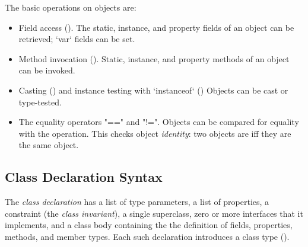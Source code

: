 The basic operations on objects are:
\begin{itemize}

{}\item Field access (). 
The static, instance, and property fields of an object can be retrieved; \xcd`var` fields
can be set.  

{}\item Method invocation ().  
Static, instance, and property methods of an object can be invoked.

{}\item Casting () and instance testing with \xcd`instanceof`
() Objects can be cast or type-tested.  

\item The equality operators \xcd"==" and \xcd"!=".  
Objects can be compared for equality with the \Xcd{==} operation.  This checks
object {\em identity}: two objects are \Xcd{==} iff they are the same object.

\end{itemize}

  
 
\subsection{Class Declaration Syntax}

The {\em class declaration} has a list of type parameters, a list of
properties, a constraint (the {\em class invariant}), a single superclass,
zero or more interfaces that it implements, and a class body containing the
the definition of fields, properties, methods, and member types. Each such
declaration introduces a class type ().


